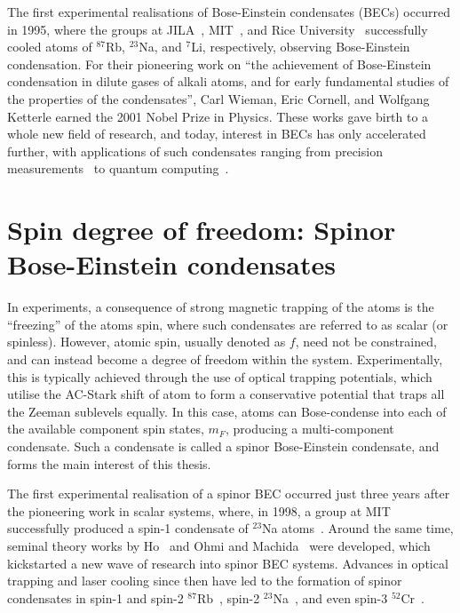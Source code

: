 The first experimental realisations of Bose-Einstein condensates (BECs) occurred
in 1995, where the groups at JILA~\cite{Anderson1995}, MIT~\cite{Davis1995}, and
Rice University~\cite{Bradley1995} successfully cooled atoms of \(^{87}\)Rb,
\(^{23}\)Na, and \(^{7}\)Li, respectively, observing Bose-Einstein condensation.
For their pioneering work on ``the achievement of Bose-Einstein condensation in
dilute gases of alkali atoms, and for early fundamental studies of the
properties of the condensates'', Carl Wieman, Eric Cornell, and Wolfgang
Ketterle earned the 2001 Nobel Prize in Physics.
These works gave birth to a whole new field of research, and today, interest in
BECs has only accelerated further, with applications of such condensates ranging
from precision measurements~\cite{Obrecht2007} to quantum
computing~\cite{Byrnes2012}.

\section{Spin degree of freedom: Spinor Bose-Einstein condensates}
In experiments, a consequence of strong magnetic trapping of the atoms is the
``freezing'' of the atoms spin, where such condensates are referred to as
scalar (or spinless).
However, atomic spin, usually denoted as \(f\), need not be constrained, and
can instead become a degree of freedom within the system.
Experimentally, this is typically achieved through the use of optical trapping
potentials, which utilise the AC-Stark shift of atom to form a conservative
potential that traps all the Zeeman sublevels equally.
In this case, atoms can Bose-condense into each of the available component spin
states, \(m_F\), producing a multi-component condensate.
Such a condensate is called a spinor Bose-Einstein condensate, and forms the
main interest of this thesis.

The first experimental realisation of a spinor BEC occurred just three years
after the pioneering work in scalar systems, where, in 1998, a group at MIT
successfully produced a spin-1 condensate of \({^{23}}\)Na
atoms~\cite{StamperKurn1998}.
Around the same time, seminal theory works by Ho~\cite{Ho1998} and Ohmi and
Machida~\cite{Ohmi1998} were developed, which kickstarted a new wave of research
into spinor BEC systems.
Advances in optical trapping and laser cooling since then have led to the
formation of spinor condensates in spin-1 and spin-2
\(^{87}\)Rb~\cite{Barrett2001, Schmaljohann2004},
spin-2 \(^{23}\)Na~\cite{Gorlitz2003}, and
even spin-3 \(^{52}\)Cr~\cite{Beaufils2008}.


